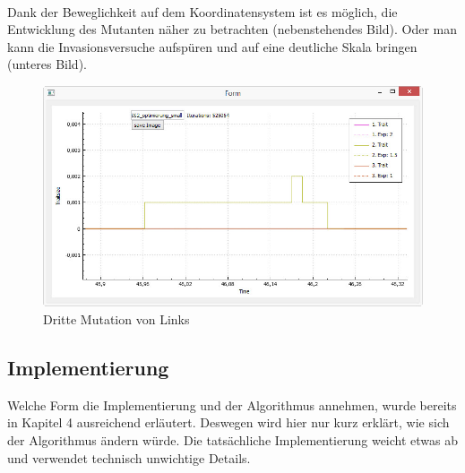\documentclass[11pt, a4paper, german]{article}
\theoremstyle{plain}
\begin{document}
\begin{center}
\begin{minipage}{1\textwidth}
\begin{minipage}{0.25\textwidth}
	\end{minipage}
	$ \quad $
	\begin{minipage}{0.28\textwidth}
		Dank der Beweglichkeit auf dem Koordinatensystem ist es möglich,  die Entwicklung des Mutanten näher zu betrachten (nebenstehendes Bild). Oder man kann die Invasionsversuche aufspüren und auf eine deutliche Skala bringen (unteres Bild).
	\end{minipage}
	\end{minipage}
	\end{center}	
	\begin{figure}[H]
		\centering
		\includegraphics[width=1\linewidth]{./Pictures/TSS_MutationZoom2_original}
		\caption{Dritte Mutation von Links}
		\label{TSS_MutationZoom2_original}
	\end{figure}
	
	\subsection{Implementierung}
	Welche Form die Implementierung und der Algorithmus annehmen, wurde bereits in Kapitel 4 ausreichend erläutert. Deswegen wird hier nur kurz erklärt, wie sich der Algorithmus ändern würde. Die tatsächliche Implementierung weicht etwas ab und verwendet technisch unwichtige Details.\\
	
\end{document}
